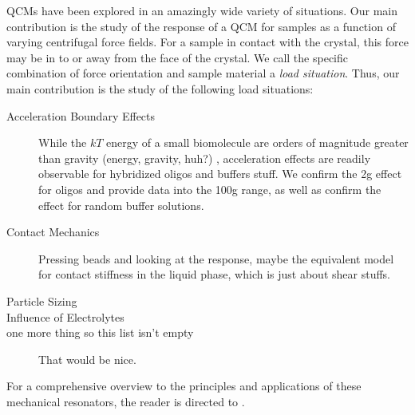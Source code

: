 QCMs have been explored in an amazingly wide variety of situations.  Our
main contribution is the study of the response of a QCM for samples as a
function of varying centrifugal force fields.  For a sample in contact with
the crystal, this force may be in to or away from the face of the
crystal.  We call the specific combination of force orientation and sample
material a \textit{load situation}.  Thus, our main contribution is the
study of the following load situations:

\begin{description}
\item[{Acceleration Boundary Effects}] While the $kT$ energy of a
small biomolecule are orders of magnitude greater than gravity (energy,
gravity, huh?)
, acceleration effects are readily observable for hybridized
oligos and buffers stuff.  We confirm the 2g effect for oligos and provide
data into the 100g range, as well as confirm the effect for random buffer
solutions.
\item[{Contact Mechanics}] Pressing beads and looking at the response,
 maybe the equivalent model for contact stiffness in the liquid phase,
 which is just about shear stuffs.
\item[{Particle Sizing}]
\item[{Influence of Electrolytes}]
\item[{one more thing so this list isn't empty}] That would be nice.
\end{description}

For a comprehensive overview to the principles and applications of these
mechanical resonators, the reader is directed to \cite{steinemreview}.

